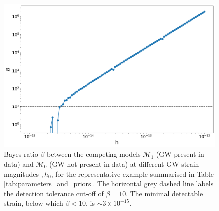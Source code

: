 \documentclass[fleqn,usenatbib,useAMS]{mnras}
\begin{document}
\begin{figure}
	\includegraphics[width=\columnwidth]{images/PaperBayesRatioPlotn1000_stacked}
	\caption{Bayes ratio $\beta$ between the competing models $\mathcal{M}_1$ (GW present in data) and $\mathcal{M}_0$ (GW not present in data) at different GW strain magnitudes $,h_0$, for the representative example summarised in Table \ref{tab:parameters_and_priors}. The horizontal grey dashed line labels the detection tolerance cut-off of $\beta = 10$. The minimal detectable strain, below which $\beta < 10$, is $\sim 3 \times 10^{-15}$.}
	\label{fig:bayes}
\end{figure}
\end{document}
